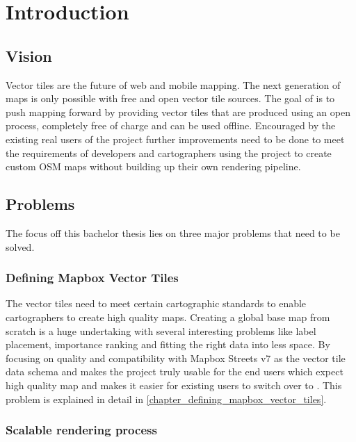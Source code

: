 \chapter{Introduction}

\section{Vision}\label{part1_vision}

Vector tiles are the future of web and mobile mapping. The next generation of maps is only possible
with free and open vector tile sources. The goal of \osmvt{} is to push mapping forward by providing
vector tiles that are produced using an open process, completely free of charge and can be used offline.
Encouraged by the existing real users of the project further improvements need to be done to meet the requirements of developers and cartographers using the project to create custom OSM maps without building up their own rendering pipeline.


\section{Problems}\label{goals}

The focus off this bachelor thesis lies on three major problems that need to be solved.

\subsection{Defining Mapbox Vector Tiles}\label{intro_carto_standards}

The vector tiles need to meet certain cartographic standards to enable cartographers to create high quality maps. Creating a global base map from scratch is a huge undertaking with several interesting problems like label placement, importance ranking and fitting the right data into less space. By focusing on quality and compatibility with Mapbox Streets v7 as the vector tile data schema and makes the project truly usable for the end users which expect high quality map and makes it easier for existing users to switch over to \osmvt{}. This problem is explained in detail in \autoref{chapter_defining_mapbox_vector_tiles}.

\subsection{Scalable rendering process}\label{scalable-rendering-process}

